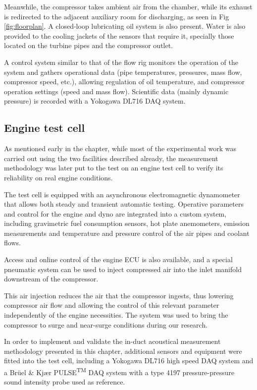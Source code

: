 Meanwhile, the compressor takes ambient air from the chamber, while its exhaust is redirected to the adjacent auxiliary room for discharging, as seen in Fig \ref{fig:floorplan}. A closed-loop lubricating oil system is also present. Water is also provided to the cooling jackets of the sensors that require it, specially those located on the turbine pipes and the compressor outlet.

A control system similar to that of the flow rig monitors the operation of the system and gathers operational data (pipe temperatures, pressures, mass flow, compressor speed, etc.), allowing regulation of oil temperature, and compressor operation settings (speed and mass flow). Scientific data (mainly dynamic pressure) is recorded with a Yokogawa DL716 DAQ system.

\subsection{Engine test cell} \label{sub:engine_cell}

As mentioned early in the chapter, while most of the experimental work was carried out using the two facilities described already, the measurement methodology was later put to the test on an engine test cell to verify its reliability on real engine conditions.

The test cell is equipped with an asynchronous electromagnetic dynamometer that allows both steady and transient automatic testing. Operative parameters and control for the engine and dyno are integrated into a custom system, including gravimetric fuel consumption sensors, hot plate anemometers, emission measurements and temperature and pressure control of the air pipes and coolant flows.

Access and online control of the engine ECU is also available, and a special pneumatic system can be used to inject compressed air into the inlet manifold downstream of the compressor.

This air injection reduces the air that the compressor ingests, thus lowering compressor air flow and allowing the control of this relevant parameter independently of the engine necessities. The system was used to bring the compressor to surge and near-surge conditions during our research.

In order to implement and validate the in-duct acoustical measurement methodology presented in this chapter, additional sensors and equipment were fitted into the test cell, including a Yokogawa DL716 high speed DAQ system and a Brüel \& Kjær PULSE\textsuperscript{TM} DAQ system with a type 4197 pressure-pressure sound intensity probe used as reference.

